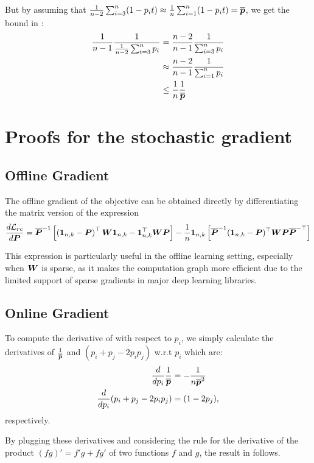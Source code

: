 But by assuming that ${\frac{1}{n-2}}\sum_{i=3}^{n} (1-{p}_i t) \approx
{\frac{1}{n}}\sum_{i=1}^{n} (1-{p}_i t)=\overline{{\bm{p}}}$, we get the bound in
:
\begin{align*}
	{\frac{1}{n-1}}{\frac{1}{{\frac{1}{n-2}}\sum_{i=3}^{n} {p}_i}}
	 & = \frac{n-2}{n-1} {\frac{1}{\sum_{i=3}^{n} {p}_i}}       \\
	 & \approx \frac{n-2}{n-1} {\frac{1}{\sum_{i=1}^{n} {p}_i}} \\
	 & \leq {\frac{1}{n}}{\frac{1}{\overline{{\bm{p}}}}}
\end{align*}

\section{Proofs for the stochastic gradient}
\subsection{Offline Gradient} \label{appendix:offlinegrad}
The offline gradient of the objective can be obtained directly by differentiating
the matrix version of the expression
\begin{align*}
	\frac{d {\mathcal{L}}_{rc}}{d{\bm{P}}}
	= \overline{{\bm{P}}}^{-1}\left[\left({\bm{1}}_{n,k}-{\bm{P}}\right)^\top{\bm{W}}{\bm{1}}_{n,k}-{\bm{1}}_{n,k}^\top{\bm{W}}{\bm{P}}\right]
	-{\frac{1}{n}}{\bm{1}}_{n,k}\left[\overline{{\bm{P}}}^{-1}({\bm{1}}_{n,k}-{\bm{P}})^\top{\bm{W}} {\bm{P}}\overline{{\bm{P}}}^{-\top}\right]
\end{align*}

This expression is particularly useful in the offline learning setting, especially
when ${\bm{W}}$ is sparse, as it makes the computation graph more efficient due to the
limited support of sparse gradients in major deep learning libraries.
\subsection{Online Gradient}\label{appendix:onlinegrad}
To compute the derivative of with respect to $p_i$, we simply calculate the
derivatives of ${\frac{1}{\overline{{\bm{p}}}}}$ and $(p_i + p_j -2 p_i p_j)$ w.r.t $p_i$ which are:
\begin{align*}
	\frac{d}{d p_i}{\frac{1}{\overline{{\bm{p}}}}}           & = -{\frac{1}{n\overline{{\bm{p}}}^2}} \\
	\frac{d}{d p_i}(p_i + p_j  -2 p_i p_j) & = (1-2p_j),         \\
\end{align*}
respectively.

By plugging these derivatives and considering the rule for the derivative of the
product $(fg)' = f'g + fg'$ of two functions $f$ and $g$, the result in
 follows.


